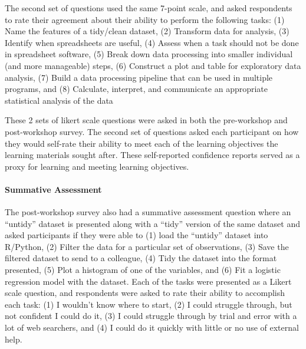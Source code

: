 \documentclass[030-workshop.tex]{subfiles}
\begin{document}
          The second set of questions used the same 7-point scale,
          and asked respondents to rate their agreement about their ability to perform the following tasks:
          (1) Name the features of a tidy/clean dataset,
          (2) Transform data for analysis,
          (3) Identify when spreadsheets are useful,
          (4) Assess when a task should not be done in spreadsheet software,
          (5) Break down data processing into smaller individual (and more manageable) steps,
          (6) Construct a plot and table for exploratory data analysis,
          (7) Build a data processing pipeline that can be used in multiple programs, and
          (8) Calculate, interpret, and communicate an appropriate statistical analysis of the data

          These 2 sets of likert scale questions were asked in both the pre-workshop and post-workshop survey.
          The second set of questions asked each participant on how they would self-rate their ability
          to meet each of the learning objectives the learning materials sought after.
          These self-reported confidence reports served as a proxy for learning and meeting learning objectives.

      \paragraph{Summative Assessment}

          The post-workshop survey also had a summative assessment question
          where an ``untidy'' dataset is presented along with a ``tidy'' version of the same dataset
          and asked participants if they were able to
          (1) load the ``untidy'' dataset into R/Python,
          (2) Filter the data for a particular set of observations,
          (3) Save the filtered dataset to send to a colleague,
          (4) Tidy the dataset into the format presented,
          (5) Plot a histogram of one of the variables, and
          (6) Fit a logistic regression model with the dataset.
          Each of the tasks were presented as a Likert scale question,
          and respondents were asked to rate their ability to accomplish each task:
          (1) I wouldn't know where to start,
          (2) I could struggle through, but not confident I could do it,
          (3) I could struggle through by trial and error with a lot of web searchers, and
          (4) I could do it quickly with little or no use of external help.




\end{document}
